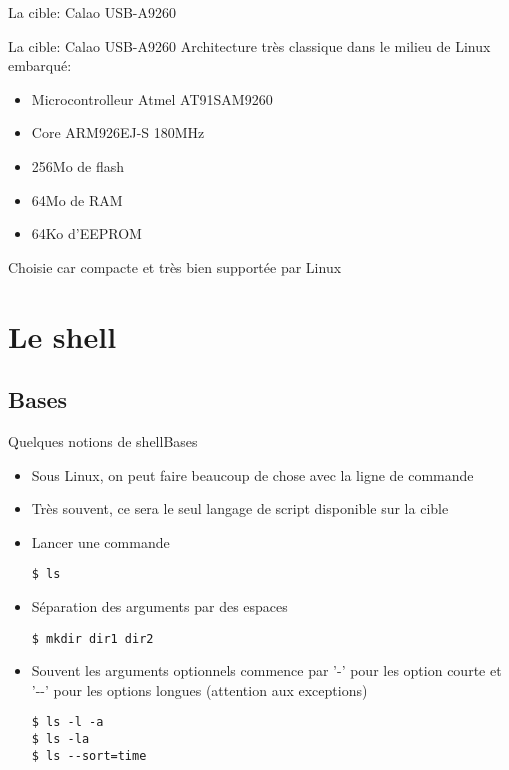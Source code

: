 \begin{frame}{La cible: Calao USB-A9260}
  \begin{center}
    \hspace{1cm}
  \end{center}
\end{frame}

\begin{frame}{La cible: Calao USB-A9260}
  Architecture très classique dans le milieu de Linux embarqué:
  \begin{itemize}
  \item Microcontrolleur Atmel AT91SAM9260
  \item Core ARM926EJ-S 180MHz
  \item 256Mo de flash
  \item 64Mo de RAM
  \item 64Ko d'EEPROM
  \end{itemize}
  Choisie car compacte et très bien supportée par Linux
\end{frame}

\section{Le shell}

\subsection{Bases}

\begin{frame}[fragile=singleslide]{Quelques notions de shell}{Bases}
  \begin{itemize}
  \item Sous Linux,  on peut faire beaucoup de chose  avec la ligne de
    commande
  \item Très souvent, ce sera le seul langage de script disponible sur
    la cible
  \item Lancer une commande
\begin{lstlisting}
$ ls
\end{lstlisting} %
  \item Séparation des arguments par des espaces
\begin{lstlisting}
$ mkdir dir1 dir2
      \end{lstlisting} %
    \item Souvent  les arguments optionnels commence par  '-' pour les
      option courte et '-\--'  pour les options longues (attention aux
      exceptions)
\begin{lstlisting}
$ ls -l -a 
$ ls -la 
$ ls --sort=time
\end{lstlisting} %
  \end{itemize}
\end{frame}


